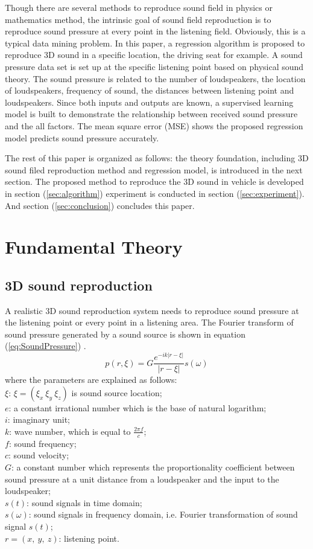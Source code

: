 \documentclass[runningheads,a4paper]{llncs}
\begin{document}
Though there are several methods to reproduce sound field in physics or mathematics method, the intrinsic goal of sound field reproduction is to reproduce sound pressure at every point in the listening field. Obviously, this is a typical data mining problem. In this paper, a regression algorithm is proposed to reproduce 3D sound in a specific location, the driving seat for example. A sound pressure data set is set up at the specific listening point based on physical sound theory. The sound pressure is related to the number of loudspeakers, the location of loudspeakers, frequency of sound, the distances between listening point and loudspeakers. Since both inputs and outputs are known, a supervised learning model is built to demonstrate the relationship between received sound pressure and the all factors. The mean square error (MSE) shows the proposed regression model predicts sound pressure accurately.

The rest of this paper is organized as follows: the theory foundation, including 3D sound filed reproduction method and regression model, is introduced in the next section. The proposed method to reproduce the 3D sound in vehicle is developed in section (\ref{sec:algorithm}) experiment is conducted in section (\ref{sec:experiment}). And section (\ref{sec:conclusion}) concludes this paper.


\section{Fundamental Theory}\label{sec:Fundamental}
\subsection{3D sound reproduction}
A realistic 3D sound reproduction system needs to reproduce sound pressure at the listening point or every point in a listening area. The Fourier transform of sound pressure generated by a sound source is shown in equation (\ref{eq:SoundPressure}) \cite{zms2015}\cite{Ando11TASLP}\cite{WS13ICME}.
\begin{equation}\label{eq:SoundPressure}
p(r,\xi)=G\frac{e^{-ik|r-\xi|}}{|r-\xi|}s(\omega)
\end{equation}
where the parameters are explained as follows:\\
$\xi$: $\xi=(\xi_x\ \xi_y\ \xi_z)$ is sound source location;\\
$e$: a constant irrational number which is the base of natural logarithm;\\
$i$: imaginary unit;\\
$k$: wave number, which is equal to $\frac{2{\pi}f}{c}$;\\
$f$: sound frequency; \\
$c$: sound velocity;\\
$G$: a constant number which represents the proportionality coefficient between sound pressure at a unit distance from a loudspeaker and the input to the loudspeaker;\\
$s(t)$: sound signals in time domain; \\
$s(\omega)$: sound signals in frequency domain, i.e. Fourier transformation of sound signal $s(t)$;\\
$r=(x,\ y,\ z)$: listening point.
\end{document}
